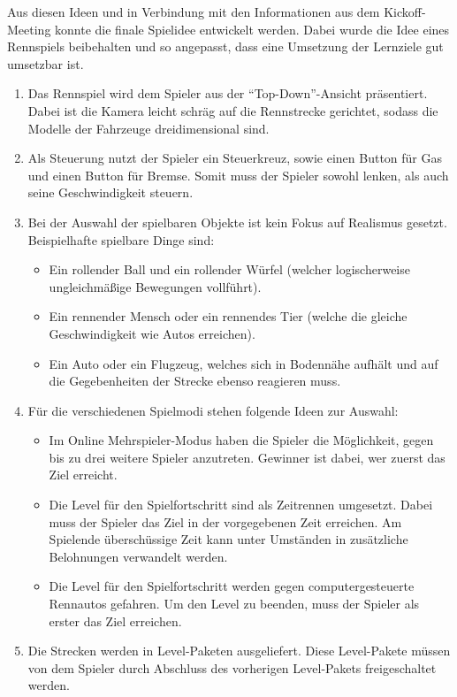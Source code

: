 	Aus diesen Ideen und in Verbindung mit den Informationen aus dem Kickoff-Meeting konnte die finale Spielidee entwickelt werden. Dabei wurde die Idee eines Rennspiels beibehalten und so angepasst, dass eine Umsetzung der Lernziele gut umsetzbar ist.
	\begin{enumerate}
		\item{Das Rennspiel wird dem Spieler aus der \enquote{Top-Down}-Ansicht präsentiert. Dabei ist die Kamera leicht schräg auf die Rennstrecke gerichtet, sodass die Modelle der Fahrzeuge dreidimensional sind.}
		\item{Als Steuerung nutzt der Spieler ein Steuerkreuz, sowie einen Button für Gas und einen Button für Bremse. Somit muss der Spieler sowohl lenken, als auch seine Geschwindigkeit steuern.}
		\item{Bei der Auswahl der spielbaren Objekte ist kein Fokus auf Realismus gesetzt. Beispielhafte spielbare Dinge sind:}
		\begin{itemize}
			\item{Ein rollender Ball und ein rollender Würfel (welcher logischerweise ungleichmäßige Bewegungen vollführt).}
			\item{Ein rennender Mensch oder ein rennendes Tier (welche die gleiche Geschwindigkeit wie Autos erreichen).}
			\item{Ein Auto oder ein Flugzeug, welches sich in Bodennähe aufhält und auf die Gegebenheiten der Strecke ebenso reagieren muss.}
		\end{itemize}
		\item{Für die verschiedenen Spielmodi stehen folgende Ideen zur Auswahl:}
		\begin{itemize}
			\item{Im Online Mehrspieler-Modus haben die Spieler die Möglichkeit, gegen bis zu drei weitere Spieler anzutreten. Gewinner ist dabei, wer zuerst das Ziel erreicht.}
			\item{Die Level für den Spielfortschritt sind als Zeitrennen umgesetzt. Dabei muss der Spieler das Ziel in der vorgegebenen Zeit erreichen. Am Spielende überschüssige Zeit kann unter Umständen in zusätzliche Belohnungen verwandelt werden.}
			\item{Die Level für den Spielfortschritt werden gegen computergesteuerte Rennautos gefahren. Um den Level zu beenden, muss der Spieler als erster das Ziel erreichen.}
		\end{itemize}
		\item{Die Strecken werden in Level-Paketen ausgeliefert. Diese Level-Pakete müssen von dem Spieler durch Abschluss des vorherigen Level-Pakets freigeschaltet werden.}

\end{enumerate}
